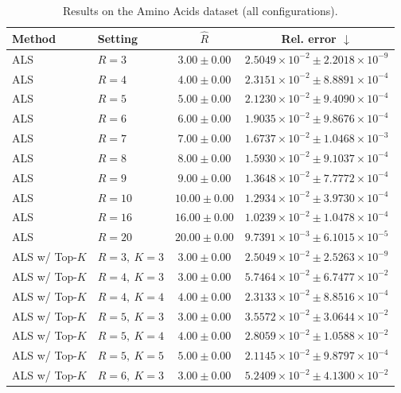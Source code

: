 \begin{table}[t]
\centering
\caption{Results on the Amino Acids dataset (all configurations).}
\label{tab:results_amino_all}
\begin{tabular}{@{}llcc@{}}
\toprule
Method & Setting & \(\hat R\) & Rel. error \(\downarrow\) \\ \midrule
ALS & \(R=3\) & \(3.00 \pm 0.00\) & \(2.5049{\times}10^{-2} \pm 2.2018{\times}10^{-9}\) \\
ALS & \(R=4\) & \(4.00 \pm 0.00\) & \(2.3151{\times}10^{-2} \pm 8.8891{\times}10^{-4}\) \\
ALS & \(R=5\) & \(5.00 \pm 0.00\) & \(2.1230{\times}10^{-2} \pm 9.4090{\times}10^{-4}\) \\
ALS & \(R=6\) & \(6.00 \pm 0.00\) & \(1.9035{\times}10^{-2} \pm 9.8676{\times}10^{-4}\) \\
ALS & \(R=7\) & \(7.00 \pm 0.00\) & \(1.6737{\times}10^{-2} \pm 1.0468{\times}10^{-3}\) \\
ALS & \(R=8\) & \(8.00 \pm 0.00\) & \(1.5930{\times}10^{-2} \pm 9.1037{\times}10^{-4}\) \\
ALS & \(R=9\) & \(9.00 \pm 0.00\) & \(1.3648{\times}10^{-2} \pm 7.7772{\times}10^{-4}\) \\
ALS & \(R=10\) & \(10.00 \pm 0.00\) & \(1.2934{\times}10^{-2} \pm 3.9730{\times}10^{-4}\) \\
ALS & \(R=16\) & \(16.00 \pm 0.00\) & \(1.0239{\times}10^{-2} \pm 1.0478{\times}10^{-4}\) \\
ALS & \(R=20\) & \(20.00 \pm 0.00\) & \(9.7391{\times}10^{-3} \pm 6.1015{\times}10^{-5}\) \\
ALS w/ Top-\(K\) & \(R=3,\ K=3\) & \(3.00 \pm 0.00\) & \(2.5049{\times}10^{-2} \pm 2.5263{\times}10^{-9}\) \\
ALS w/ Top-\(K\) & \(R=4,\ K=3\) & \(3.00 \pm 0.00\) & \(5.7464{\times}10^{-2} \pm 6.7477{\times}10^{-2}\) \\
ALS w/ Top-\(K\) & \(R=4,\ K=4\) & \(4.00 \pm 0.00\) & \(2.3133{\times}10^{-2} \pm 8.8516{\times}10^{-4}\) \\
ALS w/ Top-\(K\) & \(R=5,\ K=3\) & \(3.00 \pm 0.00\) & \(3.5572{\times}10^{-2} \pm 3.0644{\times}10^{-2}\) \\
ALS w/ Top-\(K\) & \(R=5,\ K=4\) & \(4.00 \pm 0.00\) & \(2.8059{\times}10^{-2} \pm 1.0588{\times}10^{-2}\) \\
ALS w/ Top-\(K\) & \(R=5,\ K=5\) & \(5.00 \pm 0.00\) & \(2.1145{\times}10^{-2} \pm 9.8797{\times}10^{-4}\) \\
ALS w/ Top-\(K\) & \(R=6,\ K=3\) & \(3.00 \pm 0.00\) & \(5.2409{\times}10^{-2} \pm 4.1300{\times}10^{-2}\) \\

\end{tabular}
\end{table}
